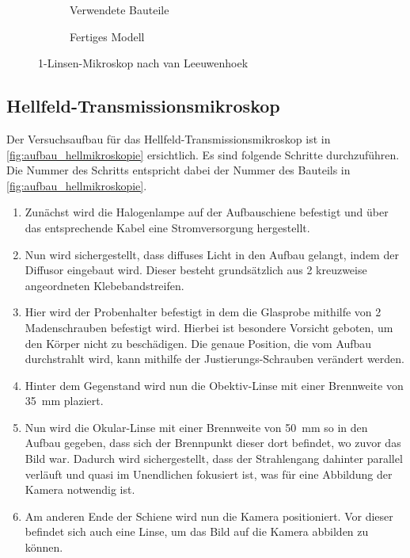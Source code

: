 \documentclass[12pt,english,ngerman]{scrartcl}
\begin{document}
\begin{figure}[H]
	\centering
	\begin{subfigure}{.30\linewidth}
		\caption{Verwendete Bauteile
		}\label{fig:mikroskop_bauteile}%
	\end{subfigure}
	\begin{subfigure}{.50\linewidth}
		\caption{Fertiges Modell
		}\label{fig:mikroskop_fertig}
	\end{subfigure}
	\caption[1-Linsen-Mikroskop nach van Leeuwenhoek] {1-Linsen-Mikroskop nach van
		Leeuwenhoek
	}\label{fig:leeuwenhoek_mikroskop}
\end{figure}

\newpage
\subsection{Hellfeld-Transmissionsmikroskop}

Der Versuchsaufbau für das Hellfeld-Transmissionsmikroskop ist in
\autoref{fig:aufbau_hellmikroskopie} ersichtlich. Es sind folgende Schritte
durchzuführen. Die Nummer des Schritts entspricht dabei der Nummer des Bauteils
in \autoref{fig:aufbau_hellmikroskopie}.

\begin{enumerate}
	\item Zunächst wird die Halogenlampe auf der Aufbauschiene befestigt und über das
	      entsprechende Kabel eine Stromversorgung hergestellt.
	\item Nun wird sichergestellt, dass diffuses Licht in den Aufbau gelangt, indem der
	      Diffusor eingebaut wird. Dieser besteht grundsätzlich aus 2 kreuzweise
	      angeordneten Klebebandstreifen.
	\item Hier wird der Probenhalter befestigt in dem die Glasprobe mithilfe von 2
	      Madenschrauben befestigt wird. Hierbei ist besondere Vorsicht geboten, um den
	      Körper nicht zu beschädigen. Die genaue Position, die vom Aufbau durchstrahlt
	      wird, kann mithilfe der Justierungs-Schrauben verändert werden.
	\item Hinter dem Gegenstand wird nun die Obektiv-Linse mit einer Brennweite von
	      \SI{35}{\milli\meter} plaziert.
	\item Nun wird die Okular-Linse mit einer Brennweite von \SI{50}{\milli\meter} so in
	      den Aufbau gegeben, dass sich der Brennpunkt dieser dort befindet, wo zuvor das
	      Bild war. Dadurch wird sichergestellt, dass der Strahlengang dahinter parallel
	      verläuft und quasi im Unendlichen fokusiert ist, was für eine Abbildung der
	      Kamera notwendig ist.
	\item Am anderen Ende der Schiene wird nun die Kamera positioniert. Vor dieser
	      befindet sich auch eine Linse, um das Bild auf die Kamera abbilden zu können.
\end{enumerate}
\end{document}
